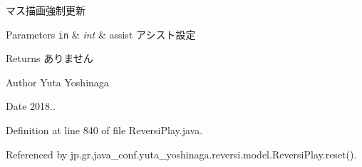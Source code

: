 マス描画強制更新 


\begin{DoxyParams}[1]{Parameters}
\mbox{\tt in}  & {\em int} & assist アシスト設定 \\
\hline
\end{DoxyParams}
\begin{DoxyReturn}{Returns}
ありません 
\end{DoxyReturn}
\begin{DoxyAuthor}{Author}
Yuta Yoshinaga 
\end{DoxyAuthor}
\begin{DoxyDate}{Date}
2018.. 
\end{DoxyDate}


Definition at line 840 of file Reversi\+Play.\+java.



Referenced by jp.\+gr.\+java\+\_\+conf.\+yuta\+\_\+yoshinaga.\+reversi.\+model.\+Reversi\+Play.\+reset().

